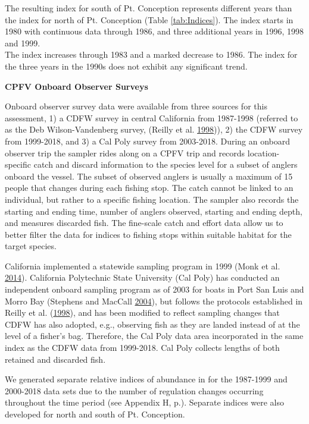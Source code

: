 \documentclass[12pt,]{article}
\begin{document}
The resulting index for south of Pt. Conception represents different
years than the index for north of Pt. Conception (Table
\ref{tab:Indices}). The index starts in 1980 with continuous data
through 1986, and three additional years in 1996, 1998 and 1999.\\
The index increases through 1983 and a marked decrease to 1986. The
index for the three years in the 1990s does not exhibit any significant
trend.

\textbf{CPFV Onboard Observer Surveys}

Onboard observer survey data were available from three sources for this
assessment, 1) a CDFW survey in central California from 1987-1998
(referred to as the Deb Wilson-Vandenberg survey, (Reilly et al.
\protect\hyperlink{ref-Reilly1998}{1998})), 2) the CDFW survey from
1999-2018, and 3) a Cal Poly survey from 2003-2018. During an onboard
observer trip the sampler rides along on a CPFV trip and records
location-specific catch and discard information to the species level for
a subset of anglers onboard the vessel. The subset of observed anglers
is usually a maximum of 15 people that changes during each fishing stop.
The catch cannot be linked to an individual, but rather to a specific
fishing location. The sampler also records the starting and ending time,
number of anglers observed, starting and ending depth, and measures
discarded fish. The fine-scale catch and effort data allow us to better
filter the data for indices to fishing stops within suitable habitat for
the target species.

California implemented a statewide sampling program in 1999 (Monk et al.
\protect\hyperlink{ref-Monk2014}{2014}). California Polytechnic State
University (Cal Poly) has conducted an independent onboard sampling
program as of 2003 for boats in Port San Luis and Morro Bay (Stephens
and MacCall \protect\hyperlink{ref-Stephens2004}{2004}), but follows the
protocols established in Reilly et al.
(\protect\hyperlink{ref-Reilly1998}{1998}), and has been modified to
reflect sampling changes that CDFW has also adopted, e.g., observing
fish as they are landed instead of at the level of a fisher's bag.
Therefore, the Cal Poly data area incorporated in the same index as the
CDFW data from 1999-2018. Cal Poly collects lengths of both retained and
discarded fish.

We generated separate relative indices of abundance in for the 1987-1999
and 2000-2018 data sets due to the number of regulation changes
occurring throughout the time period (see Appendix H,
p.\pageref{sec:AppendixH}). Separate indices were also developed for
north and south of Pt. Conception.
\end{document}
